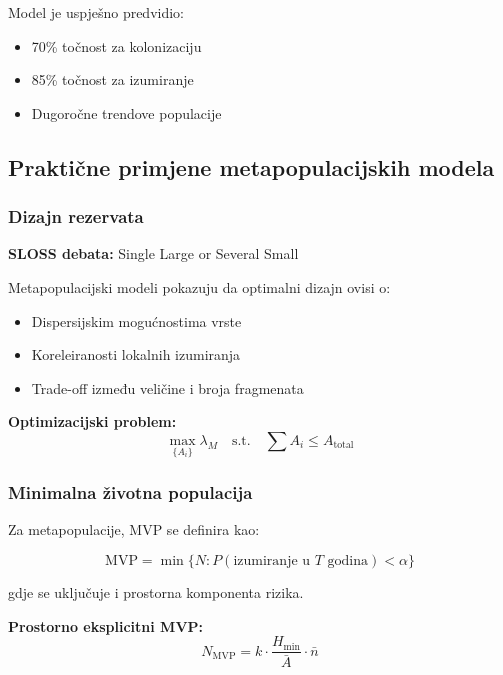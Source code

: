 \documentclass[11pt,oneside]{book}
\begin{document}
Model je uspješno predvidio:
\begin{itemize}
	\item 70\% točnost za kolonizaciju
	\item 85\% točnost za izumiranje
	\item Dugoročne trendove populacije
\end{itemize}

\subsection{Praktične primjene metapopulacijskih modela}

\subsubsection{Dizajn rezervata}

\textbf{SLOSS debata:} Single Large or Several Small

Metapopulacijski modeli pokazuju da optimalni dizajn ovisi o:
\begin{itemize}
	\item Dispersijskim mogućnostima vrste
	\item Koreleiranosti lokalnih izumiranja
	\item Trade-off između veličine i broja fragmenata
\end{itemize}

\textbf{Optimizacijski problem:}
\begin{equation}
	\max_{\{A_i\}} \lambda_M \quad \text{s.t.} \quad \sum A_i \leq A_{\text{total}}
\end{equation}

\subsubsection{Minimalna životna populacija}

Za metapopulacije, MVP se definira kao:

\begin{equation}
	\text{MVP} = \min\{N : P(\text{izumiranje u } T \text{ godina}) < \alpha\}
\end{equation}

gdje se uključuje i prostorna komponenta rizika.

\textbf{Prostorno eksplicitni MVP:}
\begin{equation}
	N_{\text{MVP}} = k \cdot \frac{H_{\text{min}}}{\bar{A}} \cdot \bar{n}
\end{equation}
\end{document}
